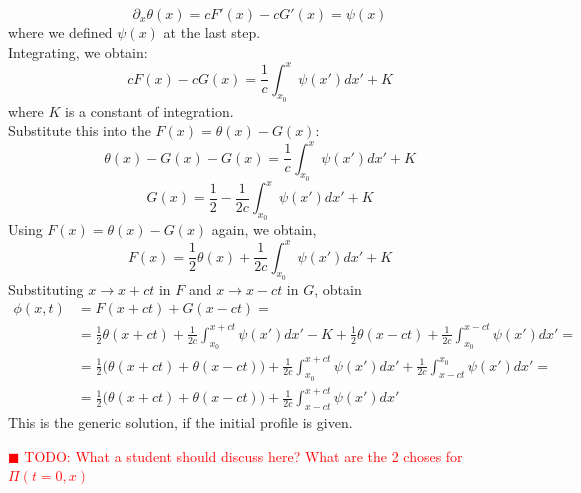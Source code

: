 \documentclass{article}
\newcommand{\todo}[1]{\textcolor{red}{$\blacksquare$ TODO: #1}}
\begin{document}
\begin{equation}
	\partial_x\theta(x) = cF'(x) - cG'(x) = \psi(x)
\end{equation}
where we defined $\psi(x)$ at the last step. \\
Integrating, we obtain:
\begin{equation}
	cF(x) - cG(x) = \frac{1}{c}\int_{x_0}^{x}\psi(x')dx' + K
\end{equation}
%
where $K$ is a constant of integration. \\
Substitute this into the $F(x) = \theta(x) - G(x)$:
\begin{equation}
	\theta(x) - G(x) -G(x) = \frac{1}{c}\int_{x_0}^{x}\psi(x')dx' + K
\end{equation}
%
\begin{equation}
	G(x) = \frac{1}{2} - \frac{1}{2c}\int_{x_0}^{x}\psi(x')dx' + K
\end{equation}
Using $F(x) = \theta(x) - G(x)$ again, we obtain,
\begin{equation}
	F(x) = \frac{1}{2}\theta(x) + \frac{1}{2c}\int_{x_0}^{x}\psi(x')dx' + K
\end{equation}
Substituting $x \rightarrow x+ct$ in $F$ and $x\rightarrow x-ct$ in $G$, obtain
\begin{equation}
	\begin{aligned}
	\phi(x,t) &= F(x+ct) + G(x-ct) = \\
	&= \frac{1}{2}\theta(x+ct) + \frac{1}{2c}\int_{x_0}^{x+ct}\psi(x')dx'-K + \frac{1}{2}\theta(x-ct) + \frac{1}{2c}\int_{x_0}^{x-ct}\psi(x')dx' = \\
	&= \frac{1}{2}\Big(\theta(x+ct)+\theta(x-ct)\Big)+\frac{1}{2c}\int_{x_0}^{x+ct}\psi(x')dx'+\frac{1}{2c}\int_{x-ct}^{x_0}\psi(x')dx' = \\
	&= \frac{1}{2}\Big(\theta(x+ct)+\theta(x-ct)\Big)+\frac{1}{2c}\int_{x-ct}^{x+ct}\psi(x')dx'
	\end{aligned}
\end{equation}
This is the generic solution, if the initial profile is given. 

\todo{What a student should discuss here? What are the 2 choses for $\Pi(t=0,x)$}
 
\end{document}

